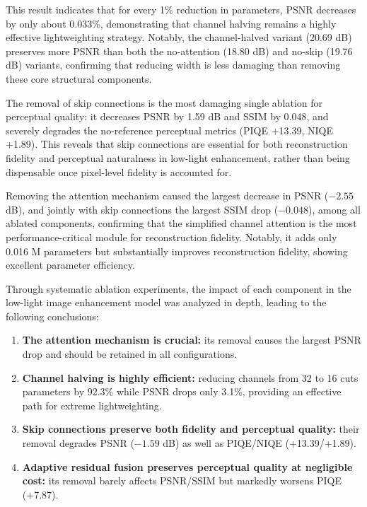 \documentclass[sensors,article,submit,moreauthors]{Definitions/mdpi}
\begin{document}
This result indicates that for every 1\% reduction in parameters, PSNR decreases by only about 0.033\%, demonstrating that channel halving remains a highly effective lightweighting strategy. Notably, the channel-halved variant (20.69 dB) preserves more PSNR than both the no-attention (18.80 dB) and no-skip (19.76 dB) variants, confirming that reducing width is less damaging than removing these core structural components.

The removal of skip connections is the most damaging single ablation for perceptual quality: it decreases PSNR by 1.59 dB and SSIM by 0.048, and severely degrades the no-reference perceptual metrics (PIQE +13.39, NIQE +1.89). This reveals that skip connections are essential for both reconstruction fidelity and perceptual naturalness in low-light enhancement, rather than being dispensable once pixel-level fidelity is accounted for.

Removing the attention mechanism caused the largest decrease in PSNR ($-2.55$ dB), and jointly with skip connections the largest SSIM drop ($-0.048$), among all ablated components, confirming that the simplified channel attention is the most performance-critical module for reconstruction fidelity. Notably, it adds only 0.016 M parameters but substantially improves reconstruction fidelity, showing excellent parameter efficiency.

Through systematic ablation experiments, the impact of each component in the low-light image enhancement model was analyzed in depth, leading to the following conclusions:

\begin{enumerate}
\item \textbf{The attention mechanism is crucial:} its removal causes the largest PSNR drop and should be retained in all configurations.
\item \textbf{Channel halving is highly efficient:} reducing channels from 32 to 16 cuts parameters by 92.3\% while PSNR drops only 3.1\%, providing an effective path for extreme lightweighting.
\item \textbf{Skip connections preserve both fidelity and perceptual quality:} their removal degrades PSNR ($-1.59$ dB) as well as PIQE/NIQE (+13.39/+1.89).
\item \textbf{Adaptive residual fusion preserves perceptual quality at negligible cost:} its removal barely affects PSNR/SSIM but markedly worsens PIQE (+7.87).
\end{enumerate}
\end{document}
